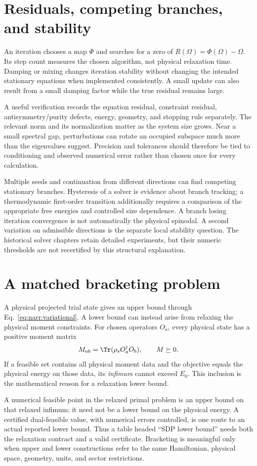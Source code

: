 \section{Residuals, competing branches, and stability}
An iteration chooses a map $\Phi$ and searches for a zero of
$R(\Omega)=\Phi(\Omega)-\Omega$. Its step count measures the chosen algorithm,
not physical relaxation time. Damping or mixing changes iteration stability
without changing the intended stationary equations when implemented consistently.
A small update can also result from a small damping factor while the true
residual remains large.

A useful verification records the equation residual, constraint residual,
antisymmetry/purity defects, energy, geometry, and stopping rule separately.
The relevant norm and its normalization matter as the system size grows.
Near a small spectral gap, perturbations can rotate an occupied subspace much
more than the eigenvalues suggest. Precision and tolerances should therefore
be tied to conditioning and observed numerical error rather than chosen once
for every calculation.

Multiple seeds and continuation from different directions can find competing
stationary branches. Hysteresis of a solver is evidence about branch tracking;
a thermodynamic first-order transition additionally requires a comparison of
the appropriate free energies and controlled size dependence. A branch losing
iteration convergence is not automatically the physical spinodal. A second
variation on admissible directions is the separate local stability question.
The historical solver chapters retain detailed experiments, but their numeric
thresholds are not recertified by this structural explanation.

\section{A matched bracketing problem}
A physical projected trial state gives an upper bound through
Eq.~\eqref{eq:narr:variational}. A lower bound can instead arise from relaxing
the physical moment constraints. For chosen operators $O_a$, every physical
state has a positive moment matrix
\begin{equation}
 M_{ab}=\Tr(\rho_s O_a^\dagger O_b),\qquad M\succeq0.
 \label{eq:narr:moment}
\end{equation}
If a feasible set contains all physical moment data and the objective equals
the physical energy on those data, its \emph{infimum} cannot exceed $E_0$.
This inclusion is the mathematical reason for a relaxation lower bound.

A numerical feasible point in the relaxed primal problem is an upper bound
on that relaxed infimum; it need not be a lower bound on the physical energy.
A certified dual-feasible value, with numerical errors controlled, is one route
to an actual reported lower bound. Thus a table headed ``SDP lower bound'' needs
both the relaxation contract and a valid certificate. Bracketing is meaningful
only when upper and lower constructions refer to the same Hamiltonian, physical
space, geometry, units, and sector restrictions.
